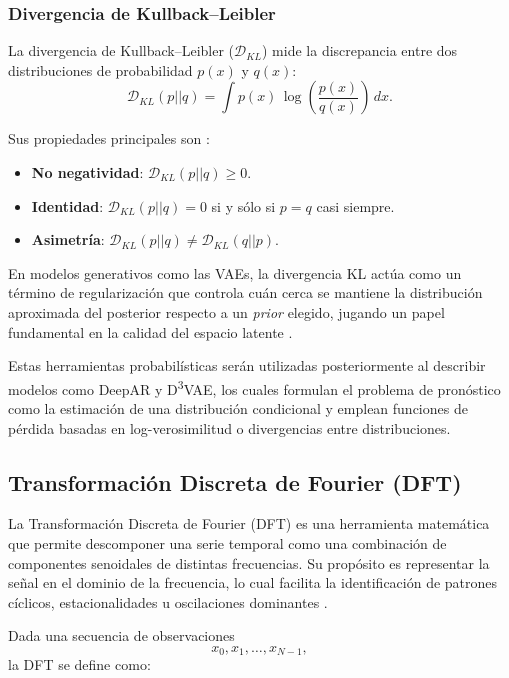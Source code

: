 \documentclass[12pt,letterpaper]{article}
\begin{document}
\subsubsection{Divergencia de Kullback--Leibler}

La divergencia de Kullback--Leibler (\( \mathcal{D}_{KL} \)) mide la discrepancia entre dos 
distribuciones de probabilidad \(p(x)\) y \(q(x)\):
\[
\mathcal{D}_{KL}(p||q) = 
\int p(x)\,\log\left(\frac{p(x)}{q(x)}\right) \, dx.
\]

Sus propiedades principales son \cite{kullback1951information}:
\begin{itemize}
    \item \textbf{No negatividad}: \( \mathcal{D}_{KL}(p||q) \ge 0\).
    \item \textbf{Identidad}: \( \mathcal{D}_{KL}(p||q)=0\) si y sólo si \(p=q\) casi siempre.
    \item \textbf{Asimetría}: \( \mathcal{D}_{KL}(p||q)\neq\mathcal{D}_{KL}(q||p)\).
\end{itemize}

En modelos generativos como las VAEs, la divergencia KL actúa como un término de 
regularización que controla cuán cerca se mantiene la distribución aproximada del posterior 
respecto a un \textit{prior} elegido, jugando un papel fundamental en la calidad del espacio 
latente \cite{kingma2013auto}.

Estas herramientas probabilísticas serán utilizadas posteriormente al describir modelos 
como DeepAR y D\textsuperscript{3}VAE, los cuales formulan el problema de pronóstico como 
la estimación de una distribución condicional y emplean funciones de pérdida basadas en 
log-verosimilitud o divergencias entre distribuciones.

\subsection{Transformación Discreta de Fourier (DFT)}

La Transformación Discreta de Fourier (DFT) es una herramienta matemática que permite 
descomponer una serie temporal como una combinación de componentes senoidales de distintas 
frecuencias. Su propósito es representar la señal en el dominio de la frecuencia, lo cual 
facilita la identificación de patrones cíclicos, estacionalidades u oscilaciones dominantes 
\cite{roberts2019spectral}.

Dada una secuencia de observaciones 
\[
x_0, x_1, \dots, x_{N-1},
\]
la DFT se define como:
\end{document}
